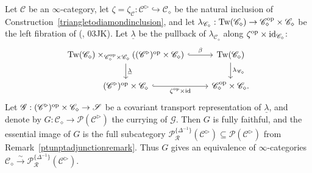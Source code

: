 \documentclass{tac}
\newcommand{\s}[1]{\mathscr{#1}}
\newcommand{\tx}[1]{\textnormal{#1}}
\newcommand{\ul}[1]{\underline{#1}}
\begin{document}
\begin{proposition}\label{diamondisfreezerocor}
Let $\s{C}$ be an $\infty$-category, let $\zeta = \zeta_\s{C} : \s{C}^\triangleright \hookrightarrow \s{C}_\diamond$ be the natural inclusion of Construction~\ref{triangletodiamondinclusion}, and let $\lambda_{\s{C}_\diamond} : \tx{Tw}(\s{C}_\diamond) \to \s{C}_\diamond^\tx{op} \times \s{C}_\diamond$ be the left fibration of (\cite{kerodon}, 03JK).  Let $\ul{\lambda}$ be the pullback of $\lambda_{\s{C}_\diamond}$ along $\zeta^\tx{op} \times \tx{id}_{\s{C}_\diamond}$:
\[\begin{tikzcd}
 \tx{Tw}(\s{C}_\diamond) \times_{ \s{C}_\diamond^\tx{op} \times \s{C}_\diamond} (  (\s{C}^\triangleright )^\tx{op} \times \s{C}_\diamond ) \arrow[hook]{r}{\beta} \arrow[]{d}{\ul{\lambda}} &  \tx{Tw}(\s{C}_\diamond) \arrow[]{d}{\lambda_{\s{C}_\diamond}} \\
 (\s{C}^\triangleright )^\tx{op} \times \s{C}_\diamond \arrow[hook]{r}[swap]{\zeta^\tx{op} \times \tx{id}}  & \s{C}_\diamond^\tx{op} \times \s{C}_\diamond .
\end{tikzcd}\]
Let $\s{G} :  (\s{C}^\triangleright )^\tx{op} \times \s{C}_\diamond \to \s{S}$ be a covariant transport representation of $\ul{\lambda}$, and denote by $G : \s{C}_\diamond \to \s{P}(\s{C}^\triangleright )$ the currying of $\s{G}$.  Then $G$ is fully faithful, and the essential image of $G$ is the full subcategory $\s{P}^{\{ \Delta^{-1} \}}_{\s{R}}(\s{C}^\triangleright) \subseteq \s{P}(\s{C}^\triangleright )$ from Remark~\ref{ptunptadjunctionremark}.  Thus $G$ gives an equivalence of $\infty$-categories $\s{C}_\diamond \xrightarrow{\sim} \s{P}^{\{ \Delta^{-1} \}}_{\s{R}}(\s{C}^\triangleright)$.
\end{proposition}
\end{document}
